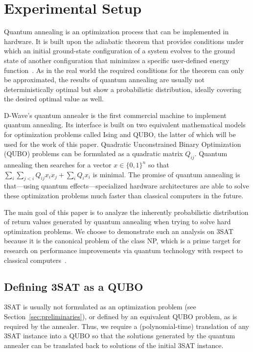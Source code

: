 \section{Experimental Setup}
\label{sec:exp-setup}

Quantum annealing is an optimization process that can be implemented in hardware. It is built upon the adiabatic theorem that provides conditions under which an initial ground-state configuration of a system evolves to the ground state of another configuration that minimizes a specific user-defined energy function~\cite{mcgeoch2014adiabatic}. As in the real world the required conditions for the theorem can only be approximated, the results of quantum annealing are usually not deterministically optimal but show a probabilistic distribution, ideally covering the desired optimal value as well.

D-Wave's quantum annealer is the first commercial machine to implement quantum annealing. Its interface is built on two equivalent mathematical models for optimization problems called Ising and QUBO, the latter of which will be used for the work of this paper. Quadratic Unconstrained Binary Optimization (QUBO) problems can be formulated as a quadratic matrix $Q_{ij}$. Quantum annealing then searches for a vector $x \in \{0,1\}^n$ so that $\sum_i \sum_{j < i} Q_{ij} x_i x_j + \sum_i Q_i x_i$ is minimal. The promise of quantum annealing is that---using quantum effects---specialized hardware architectures are able to solve these optimization problems much faster than classical computers in the future.

The main goal of this paper is to analyze the inherently probabilistic distribution of return values generated by quantum annealing when trying to solve hard optimization problems. We choose to demonstrate such an analysis on 3SAT because it is the canonical problem of the class NP, which is a prime target for research on performance improvements via quantum technology with respect to classical computers~\cite{mcgeoch2013experimental,lucas2014ising}.

\subsection{Defining 3SAT as a QUBO}
3SAT is usually not formulated as an optimization problem (see Section~\ref{sec:preliminaries}), or defined by an equivalent QUBO problem,
as is required by the annealer. Thus, we require a (polynomial-time) translation of any 3SAT instance into a QUBO so that the solutions generated by the quantum annealer can be translated back to solutions of the initial 3SAT instance.

